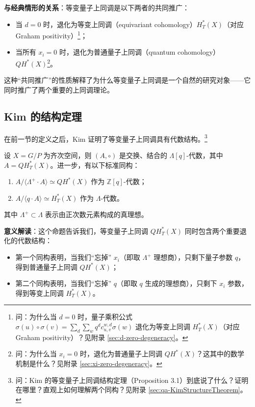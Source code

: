 \textbf{与经典情形的关系}：等变量子上同调是以下两者的共同推广：
\begin{itemize}
\item 当 $d = 0$ 时，退化为等变上同调（equivariant cohomology）$H_T^*(X)$（对应 Graham positivity）\footnote{问：为什么当 $d = 0$ 时，量子乘积公式 $\sigma(u) \circ \sigma(v) = \sum_{d} \sum_{w} q^d c_{u,v}^{w,d} \sigma(w)$ 退化为等变上同调 $H_T^*(X)$（对应 Graham positivity）？见附录 \cref{sec:d-zero-degeneracy}。}；
\item 当所有 $x_i = 0$ 时，退化为普通量子上同调（quantum cohomology）$QH^*(X)$\footnote{问：为什么当 $x_i = 0$ 时，退化为普通量子上同调 $QH^*(X)$？这其中的数学机制是什么？见附录 \cref{sec:xi-zero-degeneracy}。}。
\end{itemize}

这种``共同推广''的性质解释了为什么等变量子上同调是一个自然的研究对象——它同时推广了两个重要的上同调理论。

\subsection{Kim 的结构定理}
\label{sec:KimStructureTheorem}

在前一节的定义之后，Kim 证明了等变量子上同调具有代数结构。\footnote{问：Kim 的等变量子上同调结构定理（Proposition 3.1）到底说了什么？证明在哪里？直观上如何理解两个同构？见附录 \cref{sec:qa-KimStructureTheorem}。}

\begin{Theorem}
\label{th:KimStructure}
设 $X = G/P$ 为齐次空间，则 $(A, \circ)$ 是交换、结合的 $\Lambda[q]$-代数，其中 $A = QH_T^*(X)$。进一步，有以下标准同构：
\begin{enumerate}
\item[(1)] $A / \langle \Lambda^{+} \cdot A \rangle \simeq QH^*(X)$ 作为 $\mathbb{Z}[q]$-代数；
\item[(2)] $A / \langle q \cdot A \rangle \simeq H_T^*(X)$ 作为 $\Lambda$-代数。
\end{enumerate}
其中 $\Lambda^{+} \subset \Lambda$ 表示由正次数元素构成的真理想。
\end{Theorem}

\textbf{意义解读}：这个命题告诉我们，等变量子上同调 $QH_T^*(X)$ 同时包含两个重要退化的代数结构：
\begin{sloppypar}
\begin{itemize}
\item 第一个同构表明，当我们``忘掉'' $x_i$（即取 $\Lambda^{+}$ 理想商），只剩下量子参数 $q$，得到普通量子上同调 $QH^*(X)$；
\item 第二个同构表明，当我们``忘掉'' $q$（即取 $q$ 生成的理想商），只剩下 $x_i$ 参数，得到等变上同调 $H_T^*(X)$。
\end{itemize}
\end{sloppypar}

